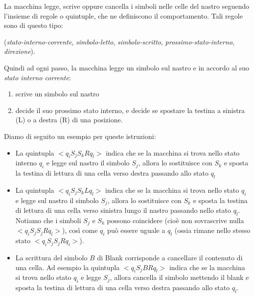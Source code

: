 La macchina legge, scrive oppure cancella i simboli nelle celle del nastro
seguendo l'insieme di regole o quintuple,  che ne definiscono il comportamento.
Tali regole sono di questo tipo:

\vspace{0.3cm}
(\textsl{stato-interno-corrente}, \textsl{simbolo-letto},
\textsl{simbolo-scritto}, \textsl{prossimo-stato-interno}, \textsl{direzione}).
\vspace{0.3cm}

Quindi ad ogni passo, la macchina legge un simbolo sul nastro e in accordo al
suo \textsl{stato interno corrente}:

\begin{enumerate}
\item scrive un simbolo sul nastro
\item decide il suo prossimo stato interno, e decide se spostare la testina a
sinistra (L) o a destra (R) di una posizione.
\end{enumerate}
\vspace{0.5cm}

Diamo di seguito un esempio per queste istruzioni:

\begin{itemize}
\item La quintupla $<q_{i}S_{j}S_{k}Rq_{l}>$ indica che se la macchina
  si trova nello stato interno $q_{i}$ e legge sul nastro il simbolo
  $S_{j}$, allora lo sostituisce con $S_{k}$ e sposta la testina di
  lettura di una cella verso destra passando allo stato $q_{l}$
\item La quintupla $<q_{i}S_{j}S_{k}Lq_{l}>$ indica che se la macchina
  si trova nello stato $q_{i}$ e legge sul nastro il simbolo $S_{j}$,
  allora lo sostituisce con $S_{k}$ e sposta la testina di lettura di
  una cella verso sinistra lungo il nastro passando nello stato
  $q_{l}$.\\ Notiamo che i simboli $S_{j}$ e $S_{k}$ possono
  coincidere (cio\`e non sovrascrive nulla $<q_{i}S_{j}S_{j}Rq_{l}>$),
  cos\`i come $q_{i}$ pu\`o essere uguale a $q_{l}$ (ossia rimane
  nello stesso stato $<q_{i}S_{j}S_{j}Rq_{i}>$).
\item La scrittura del simbolo $B$ di Blank corrisponde a cancellare
  il contenuto di una cella. Ad esempio la quintupla
  $<q_{i}S_{j}BRq_{l}>$ indica che se la macchina si trova nello stato
  $q_{i}$ e legge $S_{j}$, allora cancella il simbolo mettendo il
  blank e sposta la testina di lettura di una cella verso destra
  passando allo stato $q_{l}$.
\end{itemize}

